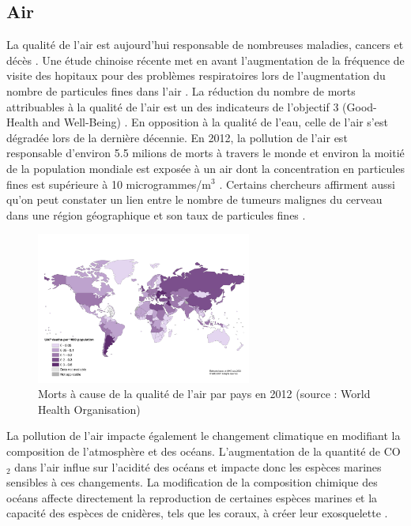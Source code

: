 \documentclass[10pt, article]{llncs}
\begin{document}
		\subsection{Air}
			La qualité de l'air est aujourd'hui responsable de nombreuses maladies, cancers et décès \cite{pope_particulate_1995}. Une étude chinoise récente met en avant l'augmentation de la fréquence de visite des hopitaux pour des problèmes respiratoires lors de l'augmentation du nombre de particules fines dans l'air \cite{liu_effects_2016}. La réduction du nombre de morts attribuables à la qualité de l'air est un des indicateurs de l'objectif 3 (Good-Health and Well-Being) \cite{united_nations_goal_nodate-5}. En opposition à la qualité de l'eau, celle de l'air s'est dégradée lors de la dernière décennie. En 2012, la pollution de l'air est responsable d'environ 5.5 milions de morts à travers le monde et environ la moitié de la population mondiale est exposée à un air dont la concentration en particules fines est supérieure à 10 microgrammes/m$^{3}$ \cite{yale_university_epi_2016}. Certains chercheurs affirment aussi qu'on peut constater un lien entre le nombre de tumeurs malignes du cerveau dans une région géographique et son taux de particules fines \cite{andersen_long-term_2017}. \\
			\begin{figure}
				\begin{center}
					\includegraphics[width=200pt]{img/pollution-deaths-by-1000-population.jpg}
				\end{center}
				\caption{Morts à cause de la qualité de l'air par pays en 2012 (source : World Health Organisation)}
			\end{figure}
			La pollution de l'air impacte également le changement climatique en modifiant la composition de l'atmosphère et des océans. L'augmentation de la quantité de CO$_{2}$ dans l'air influe sur l'acidité des océans \cite{doney_ocean_2009} et impacte donc les espèces marines sensibles à ces changements. La modification de la composition chimique des océans affecte directement la reproduction de certaines espèces marines et la capacité des espèces de cnidères, tels que les coraux, à créer leur exosquelette \cite{hoegh-guldberg_coral_2007}.  \\		
		
\end{document}
